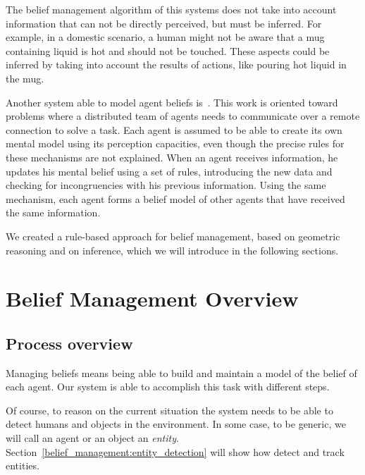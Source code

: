 The belief management algorithm of this systems does not take into account information that can not be directly perceived, but must be inferred. For example, in a domestic scenario, a human might not be aware that a mug containing liquid is hot and should not be touched. These aspects could be inferred by taking into account the results of actions, like pouring hot liquid in the mug.

Another system able to model agent beliefs is~\cite{scheutz2013computational}. This work is oriented toward problems where a distributed team of agents needs to communicate over a remote connection to solve a task. Each agent is assumed to be able to create its own mental model using its perception capacities, even though the precise rules for these mechanisms are not explained. When an agent receives information, he updates his mental belief using a set of rules, introducing the new data and checking for incongruencies with his previous information.  Using the same mechanism, each agent forms a belief model of other agents that have received the same information.

We created a rule-based approach for belief management, based on geometric reasoning and on inference, which we will introduce in the following sections. 

\section{Belief Management Overview}
\label{sec:belief_management-overview}

\subsection{Process overview}

Managing beliefs means being able to build and maintain a model of the belief of each agent. Our system is able to accomplish this task with different steps.

Of course, to reason on the current situation the system needs to be able to detect humans and objects in the environment. In some case, to be generic, we will call an agent or an object an \textit{entity}. Section~\ref{belief_management:entity_detection} will show how detect and track entities.

